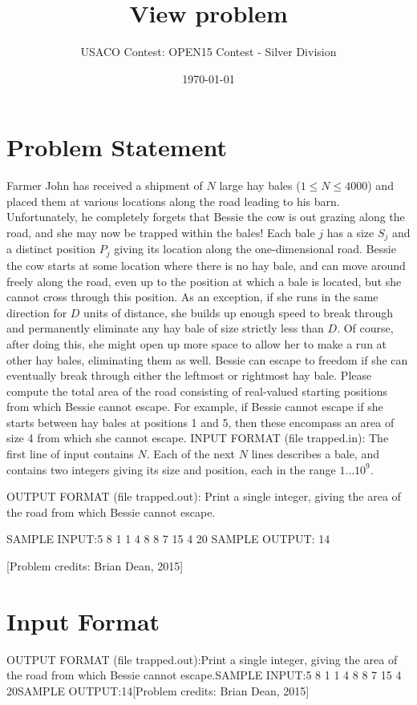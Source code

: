 \documentclass[12pt]{article}
\title{View problem}
\author{USACO Contest: OPEN15 Contest - Silver Division}
\date{\today}
\begin{document}
\maketitle

\section*{Problem Statement}

Farmer John has received a shipment of $N$ large hay bales ($1 \le N \le 4000$)
and placed them at various locations along the road leading to his barn.
Unfortunately, he completely forgets that Bessie the cow is out grazing along
the road, and she may now be trapped within the bales!
Each bale $j$ has a size $S_j$ and a distinct position $P_j$ giving its location
along the one-dimensional road.  Bessie the cow starts at some location where
there is no hay bale, and can move around freely along the road, even up to the
position at which a bale is located, but she cannot cross through this position.
As an exception, if she runs in the same direction for $D$ units of distance,
she builds up enough speed to break through and permanently eliminate any hay
bale of size strictly less than $D$.  Of course, after doing this, she
might open up more space to allow her to make a run at other hay bales,
eliminating them as well.  
Bessie can escape to freedom if she can eventually break through either the 
leftmost or rightmost hay bale.  Please compute the total area of the road
consisting of real-valued starting positions from which Bessie cannot escape.
For example, if Bessie cannot escape if she starts between hay bales at 
positions 1 and 5, then these encompass an area of size 4 from which she  cannot
escape.
INPUT FORMAT (file trapped.in):
The first line of input contains $N$.  Each of the next $N$ lines describes a
bale, and contains two integers giving its size and position, each in the range
$1\ldots 10^9$.  

OUTPUT FORMAT (file trapped.out):
Print a single integer, giving the area of the road from which Bessie cannot
escape.

SAMPLE INPUT:5
8 1
1 4
8 8
7 15
4 20
SAMPLE OUTPUT: 14

[Problem credits: Brian Dean, 2015]



\section*{Input Format}
OUTPUT FORMAT (file trapped.out):Print a single integer, giving the area of the road from which Bessie cannot
escape.SAMPLE INPUT:5
8 1
1 4
8 8
7 15
4 20SAMPLE OUTPUT:14[Problem credits: Brian Dean, 2015]
\end{document}
